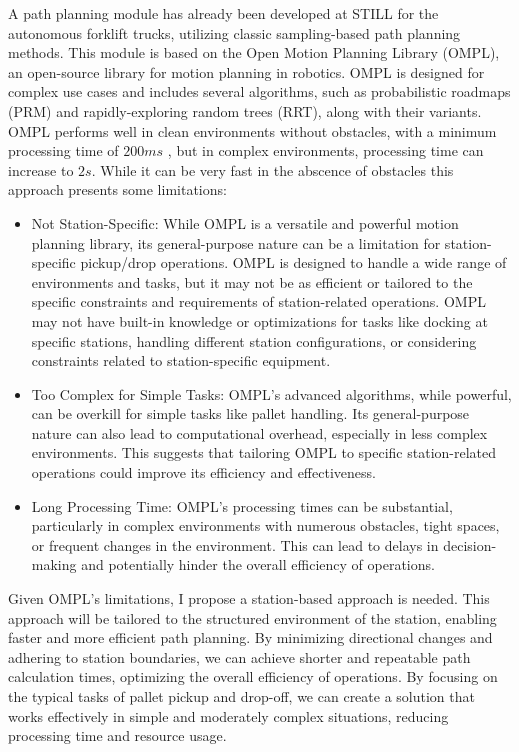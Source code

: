A path planning module has already been developed at STILL for the autonomous 
forklift trucks, utilizing classic sampling-based path planning methods. This module is based on the Open Motion 
Planning Library (OMPL), an open-source library for motion planning in robotics. OMPL is designed for complex use 
cases and includes several algorithms, such as probabilistic roadmaps (PRM) and rapidly-exploring random trees 
(RRT), along with their variants. OMPL performs well in clean environments without obstacles, with a minimum 
processing time of \(200ms\) , but in complex environments, processing time can increase to \(2s\).
While it can be very fast in the abscence of obstacles this approach presents some limitations:
\begin{itemize}
    \item Not Station-Specific: While OMPL is a versatile and powerful motion planning library, its general-purpose 
    nature can be a limitation for station-specific pickup/drop operations. OMPL is designed to handle a wide range 
    of environments and tasks, but it may not be as efficient or tailored to the specific constraints and 
    requirements of station-related operations. OMPL may not have built-in knowledge or optimizations for tasks 
    like docking at specific stations, handling different station configurations, or considering constraints 
    related to station-specific equipment.

    \item Too Complex for Simple Tasks: OMPL's advanced algorithms, while powerful, can be overkill for simple tasks 
    like pallet handling. Its general-purpose nature can also lead to computational overhead, 
    especially in less complex environments. This suggests that tailoring OMPL to specific station-related 
    operations could improve its efficiency and effectiveness.
    
    \item Long Processing Time: OMPL's processing times can be substantial, particularly in complex environments 
    with numerous obstacles, tight spaces, or frequent changes in the environment. 
    This can lead to delays in decision-making and potentially hinder the overall efficiency of operations. 
\end{itemize}

Given OMPL's limitations, I propose a station-based approach is needed. This approach will be tailored 
to the structured environment of the station, enabling faster and more efficient path planning. 
By minimizing directional changes and adhering to station boundaries, we can achieve shorter and repeatable 
path calculation times, optimizing the overall efficiency of operations. By focusing on the typical tasks of pallet 
pickup and drop-off, we can create a solution that works effectively in simple and moderately complex 
situations, reducing processing time and resource usage. 

